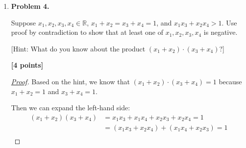 \documentclass[11pt]{article}
\begin{document}
\begin{enumerate}
\begin{proof}[\underline{Proof}]
\underline{Base case.} Prove for \(n=0\). LHS = \(\displaystyle\sum_{i=0}^{0} 2^i = 2^0 = 1\). RHS = \(2^{0+1} - 1 = 2^1 - 1 = 1\). LHS = RHS, so the base case holds.

\underline{Inductive hypothesis.} We assume that the \(\displaystyle\sum_{i=0}^{n} 2^i = 2^{n+1} - 1\) is true for some \(n \in \mathbb{N}\).

\underline{Inductive step.} Proof for \(n+1\):
\(\displaystyle\sum_{i=0}^{n+1} 2^i = 2^{(n+1)+1} - 1\)

\[
\begin{aligned}
    \sum_{i=0}^{n+1} 2^i &= 2^0 + 2^1 + 2^2 + \ldots + 2^n + 2^{n+1} \\
    &= \sum_{i=0}^{n+1} 2^i + 2^{n+1} \\
    &= (2^{n+1} - 1) + 2^{n+1}\\
    &= 2(2^{n+1}) - 1 = 2^{n+2} - 1
\end{aligned}
\]

We shows that LSH = RHS.

\underline{Conclusion.} \(\displaystyle\sum_{i=0}^{n} 2^i = 2^{n+1} - 1\) holds for all natural numbers \(n \in \mathbb{N}\).

\end{proof}

\item \textbf{Problem 4.}

Suppose \(x_1, x_2, x_3, x_4 \in \mathbb{R}\), \(x_1 + x_2 = x_3 + x_4 = 1\), and \(x_1x_3 + x_2x_4 >1\). Use proof by contradiction to show that at least one of \(x_1, x_2, x_3, x_4\) is negative.

[Hint: What do you know about the product \((x_1 + x_2)\cdot(x_3 + x_4)\)?]

\begin{flushright}
\textbf{[4 points]}
\end{flushright}

\begin{proof}[\underline{Proof}]

Based on the hint, we know that \((x_1 + x_2)\cdot(x_3 + x_4) = 1\) because \(x_1 + x_2 = 1\) and \(x_3 + x_4 = 1\).

Then we can expand the left-hand side:
\[
\begin{aligned}
(x_1 + x_2)(x_3 + x_4) &= x_1x_3 + x_1x_4 + x_2x_3 + x_2x_4 = 1\\
&= (x_1x_3 + x_2x_4) + (x_1x_4 + x_2x_3) = 1\\
\end{aligned}
\]


\end{proof}
\end{enumerate}
\end{document}
